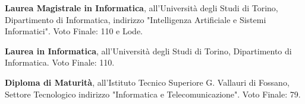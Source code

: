 
\begin{scholarship}
	{\textbf{Laurea Magistrale in Informatica},  all'Università degli Studi di Torino, Dipartimento di Informatica, indirizzo "Intelligenza Artificiale e Sistemi Informatici". Voto Finale: 110 e Lode.}
					
	{\textbf{Laurea in Informatica}, all'Università degli Studi di Torino, Dipartimento di Informatica. Voto Finale: 110.}
						
	{\textbf{Diploma di Maturità}, all'Istituto Tecnico Superiore G. Vallauri di Fossano, Settore Tecnologico indirizzo "Informatica e Telecomunicazione". Voto Finale: 79.}
		
\end{scholarship}